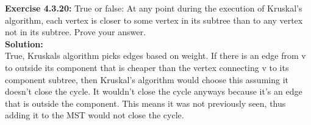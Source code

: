\documentclass[11pt,fleqn]{article}
\begin{document}
\textbf{Exercise 4.3.20:} True or false: At any point during the execution of Kruskal’s algorithm, each
vertex is closer to some vertex in its subtree than to any vertex not in its subtree. Prove
your answer.\\

\textbf{Solution:}\\
True, Kruskals algorithm picks edges based on weight. If there is an edge from v to outside its component that is cheaper than the vertex connecting v to its component subtree, then Kruskal's algorithm would choose this assuming it doesn't close the cycle. It wouldn't close the cycle anyways because it's an edge that is outside the component. This means it was not previously seen, thus adding it to the MST would not close the cycle.
\end{document}

